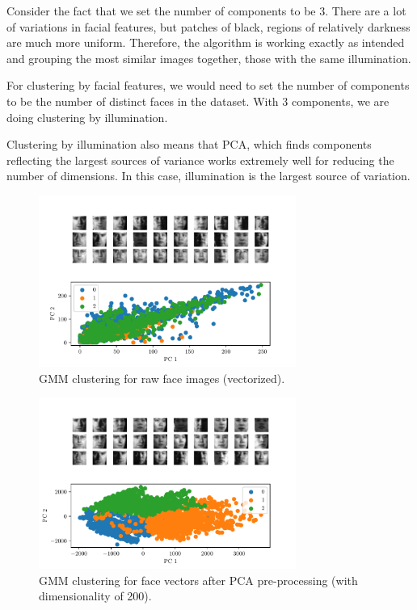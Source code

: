 \documentclass[a4paper]{exam}
\begin{document}
\begin{questions}
    Consider the fact that we set the number of components to be $3$. There are a lot of variations in facial features, but patches of black, regions of relatively darkness are much more uniform.
    Therefore, the algorithm is working exactly as intended and grouping the most similar images together, those with the same illumination.

    For clustering by facial features, we would need to set the number of components to be the number of distinct faces in the dataset. With $3$ components, we are doing clustering by illumination.

    Clustering by illumination also means that PCA, which finds components reflecting the largest sources of variance works extremely well for reducing the number of dimensions.
    In this case, illumination is the largest source of variation.

    \begin{figure}[h]
        \centering
        \includegraphics[width=0.75\textwidth]{gmm_1024}
        \caption{GMM clustering for raw face images (vectorized).}
        \label{fig:gmm_1024}
    \end{figure}

    \begin{figure}[h]
        \centering
        \includegraphics[width=0.75\textwidth]{gmm_200}
        \caption{GMM clustering for face vectors after PCA pre-processing (with dimensionality of 200).}
        \label{fig:gmm_200}
    \end{figure}


\end{questions}
\end{document}
